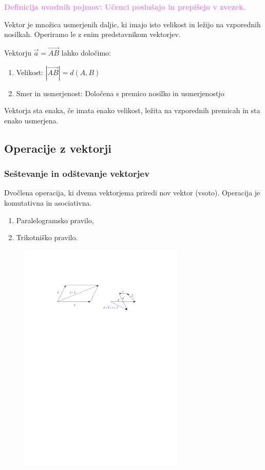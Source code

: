 \documentclass{article}
\begin{document}
\textbf{\textcolor{violet}{Definicija uvodnih pojmov: Učenci poslušajo in prepišejo v zvezek.}}

Vektor je množica usmerjenih daljic, ki imajo isto velikost in ležijo na vzporednih nosilkah. Operiramo le z enim predstavnikom vektorjev.

Vektorju $\vec{a}=\vec{AB}$ lahko določimo:

\begin{enumerate}[i]
    \item Velikost: $|\vec{AB}|=d(A,B)$
    \item Smer in usmerjenost: Določena s premico nosilko in usmerjenostjo
\end{enumerate}

Vektorja sta enaka, če imata enako velikost, ležita na vzporednih premicah in sta enako usmerjena.

\subsection*{Operacije z vektorji}

\subsubsection*{Seštevanje in odštevanje vektorjev}

Dvočlena operacija, ki dvema vektorjema priredi nov vektor (vsoto). Operacija je komutativna in asociativna.

\begin{enumerate}[i]
    \item Paralelogramsko pravilo,
    \item Trikotniško pravilo.
\end{enumerate}

\begin{figure}[H]
    \includegraphics[width=0.7\textwidth]{sestevanje_vektorjev.pdf}
    \centering
\end{figure}
\end{document}
